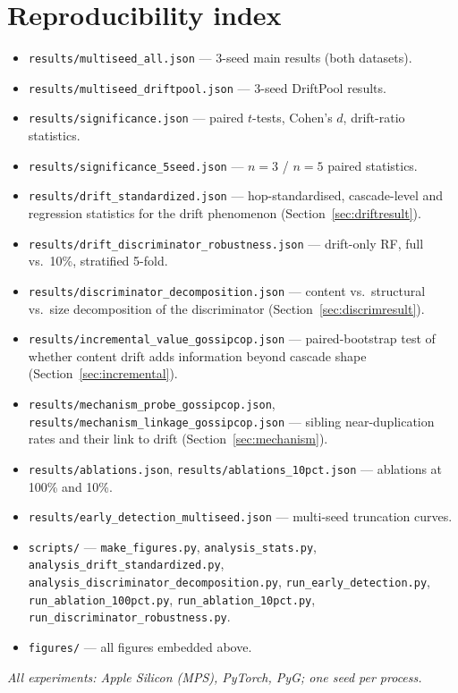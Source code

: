 \documentclass[10pt,twocolumn]{article}
\begin{document}
\section{Reproducibility index}
\label{app:repro}
\begin{itemize}[leftmargin=*,itemsep=2pt]
\item \texttt{results/multiseed\_all.json} --- 3-seed main results (both datasets).
\item \texttt{results/multiseed\_driftpool.json} --- 3-seed DriftPool results.
\item \texttt{results/significance.json} --- paired $t$-tests, Cohen's $d$, drift-ratio statistics.
\item \texttt{results/significance\_5seed.json} --- $n=3$ / $n=5$ paired statistics.
\item \texttt{results/drift\_standardized.json} --- hop-standardised, cascade-level and
  regression statistics for the drift phenomenon (Section~\ref{sec:driftresult}).
\item \texttt{results/drift\_discriminator\_robustness.json} --- drift-only RF, full vs.\ 10\%,
  stratified 5-fold.
\item \texttt{results/discriminator\_decomposition.json} --- content vs.\ structural vs.\ size
  decomposition of the discriminator (Section~\ref{sec:discrimresult}).
\item \texttt{results/incremental\_value\_gossipcop.json} --- paired-bootstrap test of whether
  content drift adds information beyond cascade shape (Section~\ref{sec:incremental}).
\item \texttt{results/mechanism\_probe\_gossipcop.json}, \texttt{results/mechanism\_linkage\_gossipcop.json}
  --- sibling near-duplication rates and their link to drift
  (Section~\ref{sec:mechanism}).
\item \texttt{results/ablations.json}, \texttt{results/ablations\_10pct.json} --- ablations at 100\% and 10\%.
\item \texttt{results/early\_detection\_multiseed.json} --- multi-seed truncation curves.
\item \texttt{scripts/} --- \texttt{make\_figures.py}, \texttt{analysis\_stats.py},
  \texttt{analysis\_drift\_standardized.py}, \texttt{analysis\_discriminator\_decomposition.py},
  \texttt{run\_early\_detection.py}, \texttt{run\_ablation\_100pct.py},
  \texttt{run\_ablation\_10pct.py}, \texttt{run\_discriminator\_robustness.py}.
\item \texttt{figures/} --- all figures embedded above.
\end{itemize}

\emph{All experiments: Apple Silicon (MPS), PyTorch, PyG; one seed per process.}
\end{document}
